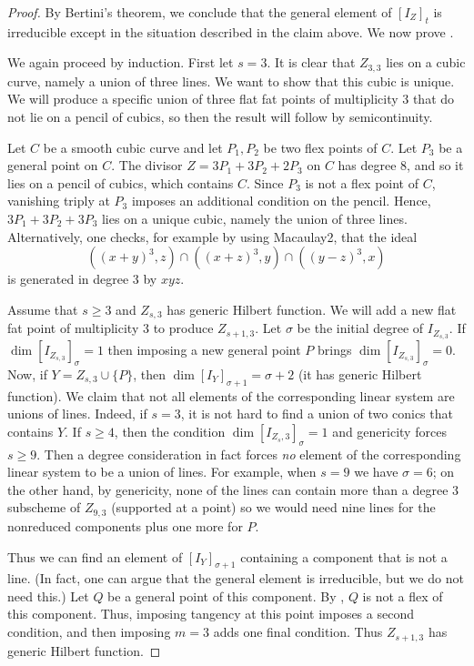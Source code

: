 \documentclass[12pt]{amsart}%
\numberwithin{equation}{section}
\theoremstyle{definition}
\numberwithin{equation}{section}
\begin{document}
\begin{proof}
By Bertini's theorem, we conclude that the general element of $[I_Z]_t$ is irreducible except in the situation described in the claim above. We now prove . 

We again proceed by induction. First let $s=3$. It is clear that $Z_{3,3}$ lies on a cubic curve, namely a union of three lines. We want to show that this cubic is unique. We will produce a specific union of three flat fat points of multiplicity 3 that do not lie on a pencil of cubics, so then the result will follow by semicontinuity. 

Let $C$ be a smooth cubic curve and let $P_1, P_2$ be two flex points of $C$. Let $P_3$ be a general point on $C$. The divisor $Z = 3P_1 + 3P_2 + 2P_3$  on $C$ has degree 8, and so it lies on a pencil of cubics, which contains $C$. Since $P_3$ is not a flex point of $C$, vanishing triply at $P_3$ imposes an additional condition on the pencil. Hence,  $3P_1 + 3P_2 + 3P_3$ lies on a unique cubic, namely the union of three lines. 
Alternatively, one checks, for example by using Macaulay2, that the ideal 
\[
((x+y)^3, z) \cap ((x+z)^3, y) \cap ((y-z)^3, x)
\]
is generated in degree 3 by $xyz$. 

Assume that $s \ge 3$ and $Z_{s,3}$ has generic Hilbert function. We will add a new flat fat point of multiplicity 3 to produce $Z_{s+1,3}$. Let $\sigma$ be the initial degree of $I_{Z_{s,3}}$. If $\dim [I_{Z_{s,3}}]_\sigma = 1$ then imposing a new general point $P$ brings $\dim [I_{Z_{s,3}}]_\sigma = 0$. Now, if $Y =  Z_{s,3} \cup \{ P \}$, then $\dim [I_Y]_{\sigma+1} = \sigma+2$ (it has generic Hilbert function). We claim  that not all elements of the corresponding linear system are unions of lines. Indeed, if $s=3$, it is not hard to find a union of two conics that contains $Y$. If $s \geq 4$, then the condition $\dim [I_{Z_s,3}]_\sigma = 1$ and genericity forces $s \geq 9$. Then a degree consideration in fact forces {\it no} element of the corresponding linear system to be a union of lines. For example, when $s=9$ we have $\sigma = 6$; on the other hand, by genericity, none of the lines can contain more than a degree 3 subscheme of $Z_{9,3}$ (supported at a point) so we would need nine lines for the nonreduced components plus one more for $P$.



Thus we can find an element of $[I_Y]_{\sigma+1}$ containing a component that is not a line. (In fact, one can argue that the general element is irreducible, but we do not need this.) Let $Q$ be a general point of this component. By , $Q$ is not a flex of this component. Thus, imposing tangency at this point imposes a second condition, and then imposing $m=3$ adds one final condition. Thus $Z_{s+1,3}$  has generic Hilbert function. 
\end{proof}
\end{document}
